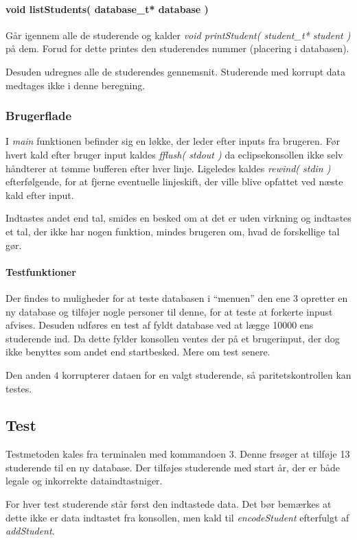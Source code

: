 \paragraph{void listStudents( database\_t* database )} Går igennem alle de
studerende og kalder \emph{void printStudent( student\_t* student )} på dem.
Forud for dette printes den studerendes nummer (placering i databasen).

Desuden udregnes alle de studerendes gennemsnit. Studerende med korrupt data
medtages ikke i denne beregning.

\subsubsection{Brugerflade}
I \emph{main} funktionen befinder sig en løkke, der leder efter inputs fra
brugeren. Før hvert kald efter bruger input kaldes \emph{fflush( stdout )} da
eclipsekonsollen ikke selv håndterer at tømme bufferen efter hver linje.
Ligeledes kaldes \emph{rewind( stdin )} efterfølgende, for at fjerne eventuelle
linjeskift, der ville blive opfattet ved næste kald efter input.

Indtastes andet end tal, smides en besked om at det er uden virkning og
indtastes et tal, der ikke har nogen funktion, mindes brugeren om, hvad de
forskellige tal gør.

\paragraph{Testfunktioner} Der findes to muligheder for at teste databasen i
``menuen'' den ene $3$ opretter en ny database og tilføjer nogle personer til
denne, for at teste at forkerte inpust afvises. 
Desuden udføres en test af fyldt database ved at lægge 10000 ens studerende ind.
Da dette fylder konsollen ventes der på et brugerinput, der dog ikke benyttes
som andet end startbesked. Mere om test senere.

Den anden $4$ korrupterer dataen for en valgt studerende, så paritetskontrollen
kan testes.

\subsection{Test}
Testmetoden kales fra terminalen med kommandoen $3$. Denne frsøger at tilføje 13
studerende til en ny database. Der tilføjes studerende med start år, der er både
legale og inkorrekte dataindtastniger.

For hver test studerende står først den indtastede data. Det bør bemærkes at
dette ikke er data indtastet fra konsollen, men kald til \emph{encodeStudent}
efterfulgt af \emph{addStudent}.

